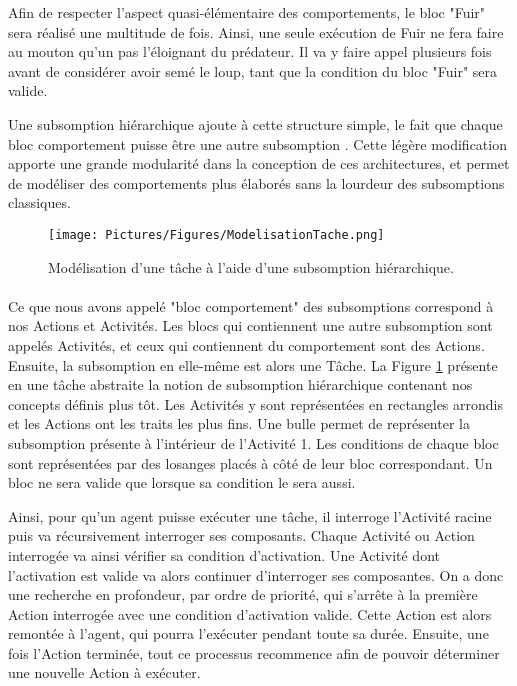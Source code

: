 			Afin de respecter l'aspect quasi-élémentaire des comportements, le bloc "Fuir" sera réalisé une multitude de fois. Ainsi, une seule exécution de Fuir ne fera faire au mouton qu'un pas l'éloignant du prédateur. Il va y faire appel plusieurs fois avant de considérer avoir semé le loup, tant que la condition du bloc "Fuir" sera valide.
			
			Une subsomption hiérarchique ajoute à cette structure simple, le fait que chaque bloc comportement puisse être une autre subsomption \cite{heckel_representational_2010}. Cette légère modification apporte une grande modularité dans la conception de ces architectures, et permet de modéliser des comportements plus élaborés sans la lourdeur des subsomptions classiques.
			
			\begin{figure}
			\centering
			\texttt{[image: Pictures/Figures/ModelisationTache.png]}
			\caption{Modélisation d'une tâche à l'aide d'une subsomption hiérarchique.}
			\label{ModelisationTache}
			\end{figure}
		\paragraph{}
			
			Ce que nous avons appelé "bloc comportement" des subsomptions correspond à nos Actions et Activités. Les blocs qui contiennent une autre subsomption sont appelés Activités, et ceux qui contiennent du comportement sont des Actions. Ensuite, la subsomption en elle-même est alors une Tâche. La Figure \ref{ModelisationTache} présente en une tâche abstraite la notion de subsomption hiérarchique contenant nos concepts définis plus tôt. Les Activités y sont représentées en rectangles arrondis et les Actions ont les traits les plus fins. Une bulle permet de représenter la subsomption présente à l'intérieur de l'Activité 1. Les conditions de chaque bloc sont représentées par des losanges placés à côté de leur bloc correspondant. Un bloc ne sera valide que lorsque sa condition le sera aussi.
			
			Ainsi, pour qu'un agent puisse exécuter une tâche, il interroge l'Activité racine puis va récursivement interroger ses composants. Chaque Activité ou Action interrogée va ainsi vérifier sa condition d'activation. Une Activité dont l'activation est valide va alors continuer d'interroger ses composantes. On a donc une recherche en profondeur, par ordre de priorité, qui s'arrête à la première Action interrogée avec une condition d'activation valide. Cette Action est alors remontée à l'agent, qui pourra l'exécuter pendant toute sa durée. Ensuite, une fois l'Action terminée, tout ce processus recommence afin de pouvoir déterminer une nouvelle Action à exécuter.
			
